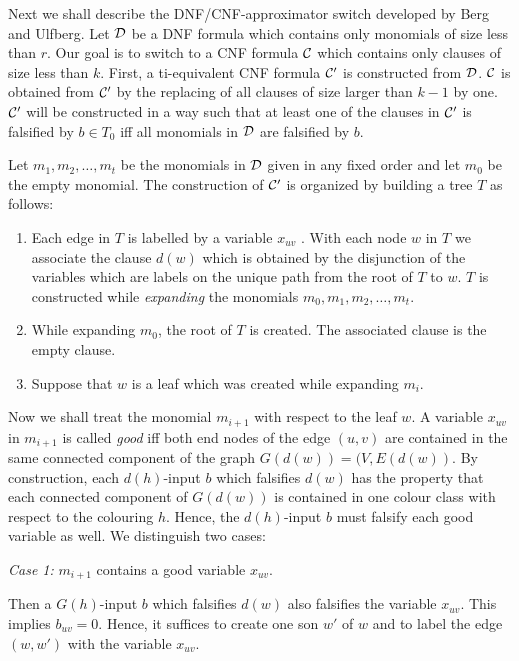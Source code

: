 \documentclass[11pt]{article}
\begin{document}
\smallskip
Next we shall describe the DNF/CNF-approximator switch developed by Berg and Ulfberg. Let ${\cal D}$ be a DNF formula
which contains only monomials of size less than $r$. Our goal is to switch to a CNF formula ${\cal C}$ which contains
only clauses of size less than $k$. First, a ti-equivalent CNF formula ${\cal C}'$ is constructed from ${\cal D}$.
${\cal C}$ is obtained from ${\cal C}'$ by the replacing of all clauses of size larger than $k-1$ by one.
${\cal C}'$ will be constructed in a way such that at least one of the clauses in ${\cal C}'$ is falsified by
$b \in T_0$ iff all monomials in ${\cal D}$ are falsified by $b$.

Let $m_1,m_2, \ldots,m_t$ be the monomials in ${\cal D}$ given in any fixed order and let $m_0$ be the empty
monomial. The construction of ${\cal C}'$ is organized by building a tree $T$ as follows:
\begin{enumerate}
\item
  Each edge in $T$ is labelled by a variable $x_{uv}$ . With each node $w$ in $T$ we associate the
  clause $d(w)$ which is obtained by the disjunction of the variables which are labels on the unique path from
  the root of $T$ to $w$. $T$ is constructed while {\em expanding\/} the monomials $m_0,m_1,m_2, \ldots,m_t$.
\item
  While expanding $m_0$, the root of $T$ is created. The associated clause is the empty clause.
\item
  Suppose that $w$ is a leaf which was created while expanding $m_i$.
\end{enumerate}

Now we shall treat the monomial $m_{i+1}$ with respect to the leaf $w$. A variable $x_{uv}$ in $m_{i+1}$ is called
{\em good\/} iff both end nodes of the edge $(u,v)$ are contained in the same connected component of the graph
$G(d(w)) = (V,E(d(w))$. By construction, each $d(h)$-input
$b$ which falsifies $d(w)$ has the property that each connected component of $G(d(w))$ is contained in one colour
class with respect to the colouring $h$. Hence, the $d(h)$-input $b$ must falsify each good variable as well. We
distinguish two cases:

\smallskip
\noindent
{\em Case 1:} $m_{i+1}$ contains a good variable $x_{uv}$.

\smallskip
Then a $G(h)$-input $b$ which falsifies $d(w)$ also falsifies the variable $x_{uv}$. This implies $b_{uv} = 0$. Hence,
it suffices to create one son $w'$ of $w$ and to label the edge $(w,w')$ with the variable $x_{uv}$.
\end{document}
